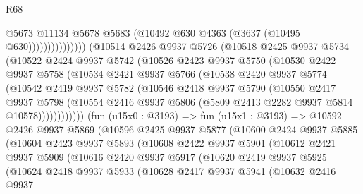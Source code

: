 \begin{lexlean}{R68}
\begin{coremodule}
                                @5673
                                @11134
                                @5678
                                @5683
                                (@10492 @630 @4363 (@3637 (@10495 @630)))))))))))))))
        (@10514
          @2426
          @9937
          @5726
          (@10518
            @2425
            @9937
            @5734
            (@10522
              @2424
              @9937
              @5742
              (@10526
                @2423
                @9937
                @5750
                (@10530
                  @2422
                  @9937
                  @5758
                  (@10534
                    @2421
                    @9937
                    @5766
                    (@10538
                      @2420
                      @9937
                      @5774
                      (@10542
                        @2419
                        @9937
                        @5782
                        (@10546
                          @2418
                          @9937
                          @5790
                          (@10550
                            @2417
                            @9937
                            @5798
                            (@10554
                              @2416
                              @9937
                              @5806
                              (@5809 @2413 @2282 @9937 @5814 @10578))))))))))))
        (fun (u15x0 : @3193) =>
        fun (u15x1 : @3193) =>
        @10592
          @2426
          @9937
          @5869
          (@10596
            @2425
            @9937
            @5877
            (@10600
              @2424
              @9937
              @5885
              (@10604
                @2423
                @9937
                @5893
                (@10608
                  @2422
                  @9937
                  @5901
                  (@10612
                    @2421
                    @9937
                    @5909
                    (@10616
                      @2420
                      @9937
                      @5917
                      (@10620
                        @2419
                        @9937
                        @5925
                        (@10624
                          @2418
                          @9937
                          @5933
                          (@10628
                            @2417
                            @9937
                            @5941
                            (@10632
                              @2416
                              @9937

\end{coremodule}
\end{lexlean}
